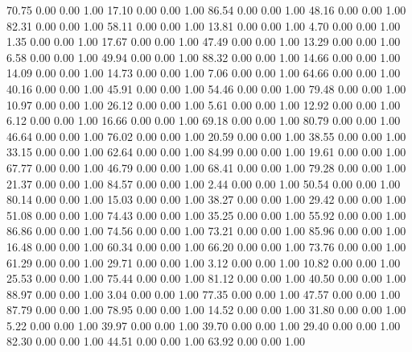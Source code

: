   70.75   0.00   0.00   1.00
   17.10   0.00   0.00   1.00
   86.54   0.00   0.00   1.00
   48.16   0.00   0.00   1.00
   82.31   0.00   0.00   1.00
   58.11   0.00   0.00   1.00
   13.81   0.00   0.00   1.00
    4.70   0.00   0.00   1.00
    1.35   0.00   0.00   1.00
   17.67   0.00   0.00   1.00
   47.49   0.00   0.00   1.00
   13.29   0.00   0.00   1.00
    6.58   0.00   0.00   1.00
   49.94   0.00   0.00   1.00
   88.32   0.00   0.00   1.00
   14.66   0.00   0.00   1.00
   14.09   0.00   0.00   1.00
   14.73   0.00   0.00   1.00
    7.06   0.00   0.00   1.00
   64.66   0.00   0.00   1.00
   40.16   0.00   0.00   1.00
   45.91   0.00   0.00   1.00
   54.46   0.00   0.00   1.00
   79.48   0.00   0.00   1.00
   10.97   0.00   0.00   1.00
   26.12   0.00   0.00   1.00
    5.61   0.00   0.00   1.00
   12.92   0.00   0.00   1.00
    6.12   0.00   0.00   1.00
   16.66   0.00   0.00   1.00
   69.18   0.00   0.00   1.00
   80.79   0.00   0.00   1.00
   46.64   0.00   0.00   1.00
   76.02   0.00   0.00   1.00
   20.59   0.00   0.00   1.00
   38.55   0.00   0.00   1.00
   33.15   0.00   0.00   1.00
   62.64   0.00   0.00   1.00
   84.99   0.00   0.00   1.00
   19.61   0.00   0.00   1.00
   67.77   0.00   0.00   1.00
   46.79   0.00   0.00   1.00
   68.41   0.00   0.00   1.00
   79.28   0.00   0.00   1.00
   21.37   0.00   0.00   1.00
   84.57   0.00   0.00   1.00
    2.44   0.00   0.00   1.00
   50.54   0.00   0.00   1.00
   80.14   0.00   0.00   1.00
   15.03   0.00   0.00   1.00
   38.27   0.00   0.00   1.00
   29.42   0.00   0.00   1.00
   51.08   0.00   0.00   1.00
   74.43   0.00   0.00   1.00
   35.25   0.00   0.00   1.00
   55.92   0.00   0.00   1.00
   86.86   0.00   0.00   1.00
   74.56   0.00   0.00   1.00
   73.21   0.00   0.00   1.00
   85.96   0.00   0.00   1.00
   16.48   0.00   0.00   1.00
   60.34   0.00   0.00   1.00
   66.20   0.00   0.00   1.00
   73.76   0.00   0.00   1.00
   61.29   0.00   0.00   1.00
   29.71   0.00   0.00   1.00
    3.12   0.00   0.00   1.00
   10.82   0.00   0.00   1.00
   25.53   0.00   0.00   1.00
   75.44   0.00   0.00   1.00
   81.12   0.00   0.00   1.00
   40.50   0.00   0.00   1.00
   88.97   0.00   0.00   1.00
    3.04   0.00   0.00   1.00
   77.35   0.00   0.00   1.00
   47.57   0.00   0.00   1.00
   87.79   0.00   0.00   1.00
   78.95   0.00   0.00   1.00
   14.52   0.00   0.00   1.00
   31.80   0.00   0.00   1.00
    5.22   0.00   0.00   1.00
   39.97   0.00   0.00   1.00
   39.70   0.00   0.00   1.00
   29.40   0.00   0.00   1.00
   82.30   0.00   0.00   1.00
   44.51   0.00   0.00   1.00
   63.92   0.00   0.00   1.00

